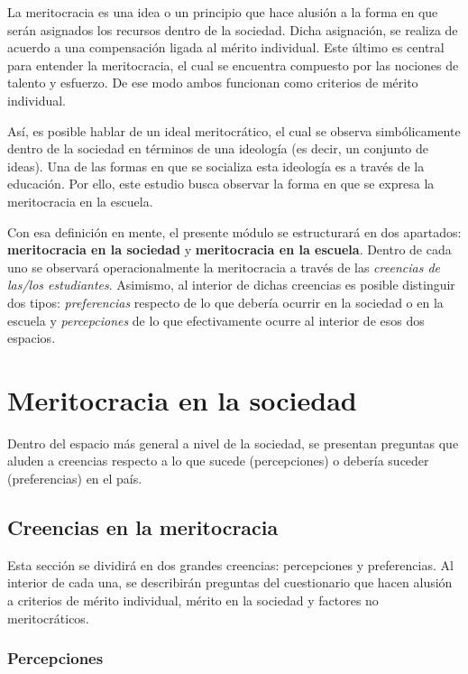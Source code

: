 \documentclass[
  letterpaper,
  DIV=11,
  numbers=noendperiod]{scrreprt}
\begin{document}
La meritocracia es una idea o un principio que hace alusión a la forma
en que serán asignados los recursos dentro de la sociedad. Dicha
asignación, se realiza de acuerdo a una compensación ligada al mérito
individual. Este último es central para entender la meritocracia, el
cual se encuentra compuesto por las nociones de talento y esfuerzo. De
ese modo ambos funcionan como criterios de mérito individual.~

Así, es posible hablar de un ideal meritocrático, el cual se observa
simbólicamente dentro de la sociedad en términos de una ideología (es
decir, un conjunto de ideas). Una de las formas en que se socializa esta
ideología es a través de la educación. Por ello, este estudio busca
observar la forma en que se expresa la meritocracia en la escuela.~

Con esa definición en mente, el presente módulo se estructurará en dos
apartados: \textbf{meritocracia en la sociedad} y \textbf{meritocracia
en la escuela}. Dentro de cada uno se observará operacionalmente la
meritocracia a través de las \emph{creencias de las/los estudiantes}.
Asimismo, al interior de dichas creencias es posible distinguir dos
tipos: \emph{preferencias} respecto de lo que debería ocurrir en la
sociedad o en la escuela y \emph{percepciones} de lo que efectivamente
ocurre al interior de esos dos espacios.

\section{Meritocracia en la sociedad}\label{meritocracia-en-la-sociedad}

Dentro del espacio más general a nivel de la sociedad, se presentan
preguntas que aluden a creencias respecto a lo que sucede (percepciones)
o debería suceder (preferencias) en el país.

\subsection{Creencias en la
meritocracia}\label{creencias-en-la-meritocracia}

Esta sección se dividirá en dos grandes creencias: percepciones y
preferencias. Al interior de cada una, se describirán preguntas del
cuestionario que hacen alusión a criterios de mérito individual, mérito
en la sociedad y factores no meritocráticos.

\subsubsection{Percepciones}\label{percepciones}
\end{document}
